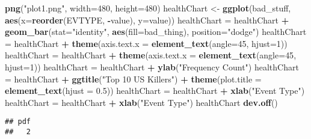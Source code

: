 \documentclass[]{article}
\newenvironment{Shaded}{\begin{snugshade}}{\end{snugshade}}
\newcommand{\DataTypeTok}[1]{\textcolor[rgb]{0.13,0.29,0.53}{#1}}
\newcommand{\DecValTok}[1]{\textcolor[rgb]{0.00,0.00,0.81}{#1}}
\newcommand{\FloatTok}[1]{\textcolor[rgb]{0.00,0.00,0.81}{#1}}
\newcommand{\KeywordTok}[1]{\textcolor[rgb]{0.13,0.29,0.53}{\textbf{#1}}}
\newcommand{\NormalTok}[1]{#1}
\newcommand{\OperatorTok}[1]{\textcolor[rgb]{0.81,0.36,0.00}{\textbf{#1}}}
\newcommand{\StringTok}[1]{\textcolor[rgb]{0.31,0.60,0.02}{#1}}
\begin{document}
\begin{Shaded}
\begin{Highlighting}[]
\KeywordTok{png}\NormalTok{(}\StringTok{"plot1.png"}\NormalTok{, }\DataTypeTok{width=}\DecValTok{480}\NormalTok{, }\DataTypeTok{height=}\DecValTok{480}\NormalTok{)}
\NormalTok{healthChart <-}\StringTok{ }\KeywordTok{ggplot}\NormalTok{(bad_stuff, }\KeywordTok{aes}\NormalTok{(}\DataTypeTok{x=}\KeywordTok{reorder}\NormalTok{(EVTYPE, }\OperatorTok{-}\NormalTok{value), }\DataTypeTok{y=}\NormalTok{value))}
\NormalTok{healthChart =}\StringTok{ }\NormalTok{healthChart }\OperatorTok{+}\StringTok{ }\KeywordTok{geom_bar}\NormalTok{(}\DataTypeTok{stat=}\StringTok{"identity"}\NormalTok{, }\KeywordTok{aes}\NormalTok{(}\DataTypeTok{fill=}\NormalTok{bad_thing), }\DataTypeTok{position=}\StringTok{"dodge"}\NormalTok{)}
\NormalTok{healthChart =}\StringTok{ }\NormalTok{healthChart }\OperatorTok{+}\StringTok{ }\KeywordTok{theme}\NormalTok{(}\DataTypeTok{axis.text.x =} \KeywordTok{element_text}\NormalTok{(}\DataTypeTok{angle=}\DecValTok{45}\NormalTok{, }\DataTypeTok{hjust=}\DecValTok{1}\NormalTok{))}
\NormalTok{healthChart =}\StringTok{ }\NormalTok{healthChart }\OperatorTok{+}\StringTok{ }\KeywordTok{theme}\NormalTok{(}\DataTypeTok{axis.text.x =} \KeywordTok{element_text}\NormalTok{(}\DataTypeTok{angle=}\DecValTok{45}\NormalTok{, }\DataTypeTok{hjust=}\DecValTok{1}\NormalTok{))}
\NormalTok{healthChart =}\StringTok{ }\NormalTok{healthChart }\OperatorTok{+}\StringTok{ }\KeywordTok{ylab}\NormalTok{(}\StringTok{"Frequency Count"}\NormalTok{) }
\NormalTok{healthChart =}\StringTok{ }\NormalTok{healthChart }\OperatorTok{+}\StringTok{ }\KeywordTok{ggtitle}\NormalTok{(}\StringTok{"Top 10 US Killers"}\NormalTok{) }\OperatorTok{+}\StringTok{ }\KeywordTok{theme}\NormalTok{(}\DataTypeTok{plot.title =} \KeywordTok{element_text}\NormalTok{(}\DataTypeTok{hjust =} \FloatTok{0.5}\NormalTok{))}
\NormalTok{healthChart =}\StringTok{ }\NormalTok{healthChart }\OperatorTok{+}\StringTok{ }\KeywordTok{xlab}\NormalTok{(}\StringTok{"Event Type"}\NormalTok{) }
\NormalTok{healthChart =}\StringTok{ }\NormalTok{healthChart }\OperatorTok{+}\StringTok{ }\KeywordTok{xlab}\NormalTok{(}\StringTok{"Event Type"}\NormalTok{) }
\NormalTok{healthChart}
\KeywordTok{dev.off}\NormalTok{()}
\end{Highlighting}
\end{Shaded}

\begin{verbatim}
## pdf 
##   2
\end{verbatim}
\end{document}
